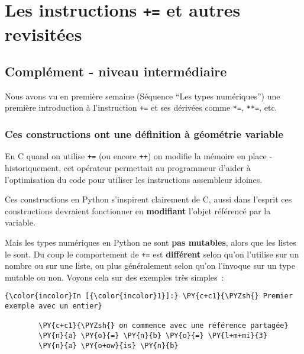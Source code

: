     
    
    
    

    

    \hypertarget{les-instructions-et-autres-revisituxe9es}{%
\section{\texorpdfstring{Les instructions \texttt{+=} et autres
revisitées}{Les instructions += et autres revisitées}}\label{les-instructions-et-autres-revisituxe9es}}

    \hypertarget{compluxe9ment---niveau-intermuxe9diaire}{%
\subsection{Complément - niveau
intermédiaire}\label{compluxe9ment---niveau-intermuxe9diaire}}

    Nous avons vu en première semaine (Séquence ``Les types numériques'')
une première introduction à l'instruction \texttt{+=} et ses dérivées
comme \texttt{*=}, \texttt{**=}, etc.

    \hypertarget{ces-constructions-ont-une-duxe9finition-uxe0-guxe9omuxe9trie-variable}{%
\subsubsection{Ces constructions ont une définition à géométrie
variable}\label{ces-constructions-ont-une-duxe9finition-uxe0-guxe9omuxe9trie-variable}}

    En C quand on utilise \texttt{+=} (ou encore \texttt{++}) on modifie la
mémoire en place - historiquement, cet opérateur permettait au
programmeur d'aider à l'optimisation du code pour utiliser les
instructions assembleur idoines.

Ces constructions en Python s'inspirent clairement de C, aussi dans
l'esprit ces constructions devraient fonctionner en \textbf{modifiant}
l'objet référencé par la variable.

Mais les types numériques en Python ne sont \textbf{pas mutables}, alors
que les listes le sont. Du coup le comportement de \texttt{+=} est
\textbf{différent} selon qu'on l'utilise sur un nombre ou sur une liste,
ou plus généralement selon qu'on l'invoque sur un type mutable ou non.
Voyons cela sur des exemples très simples~:

    \begin{Verbatim}[commandchars=\\\{\},frame=single,framerule=0.3mm,rulecolor=\color{cellframecolor}]
{\color{incolor}In [{\color{incolor}1}]:} \PY{c+c1}{\PYZsh{} Premier exemple avec un entier}
        
        \PY{c+c1}{\PYZsh{} on commence avec une référence partagée}
        \PY{n}{a} \PY{o}{=} \PY{n}{b} \PY{o}{=} \PY{l+m+mi}{3}
        \PY{n}{a} \PY{o+ow}{is} \PY{n}{b}
\end{Verbatim}


